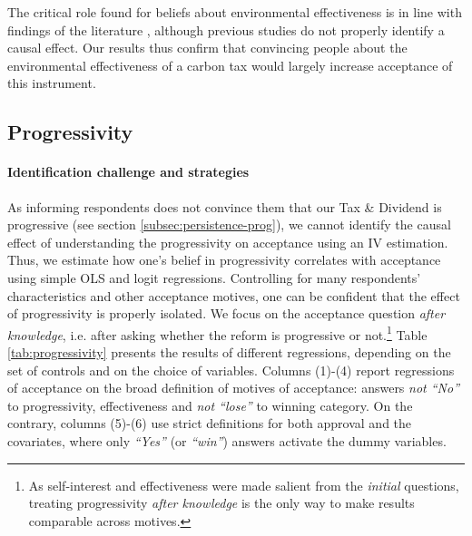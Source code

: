 \documentclass[12pt]{article} %
\begin{document}

The critical role found for beliefs about environmental effectiveness is in line with findings of the literature \citep{saelen_choice_2011,kallbekken_saelen_2011,baranzini_effectiveness_2017}, although previous studies do not properly identify a causal effect. Our results thus confirm that convincing people about the environmental effectiveness of a carbon tax would largely increase acceptance of this instrument.

    \subsection{Progressivity}

\paragraph{Identification challenge and strategies}

As informing respondents does not convince them that our Tax \& Dividend is progressive (see section \ref{subsec:persistence-prog}), we cannot identify the causal effect of understanding the progressivity on acceptance using an IV estimation. Thus, we estimate how one's belief in progressivity correlates with acceptance using simple OLS and logit regressions. Controlling for many respondents' characteristics and other acceptance motives, one can be confident that the effect of progressivity is properly isolated. We focus on the acceptance question \textit{after knowledge}, i.e. after asking whether the reform is progressive or not.\footnote{As self-interest and effectiveness were made salient from the \textit{initial} questions, treating progressivity \textit{after knowledge} is the only way to make results comparable across motives.} Table \ref{tab:progressivity} presents the results of different regressions, depending on the set of controls and on the choice of variables. Columns (1)-(4) report regressions of acceptance on the broad definition of motives of acceptance: answers \textit{not ``No''} to progressivity, effectiveness and \textit{not ``lose''} to winning category. On the contrary, columns (5)-(6) use strict definitions for both approval and the covariates, where only \textit{``Yes''} (or \textit{``win''}) answers activate the dummy variables. 
\end{document}

